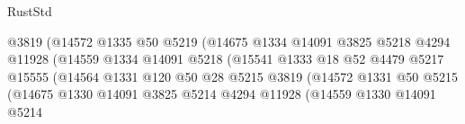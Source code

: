 \begin{lexlean}{RustStd}
\begin{coremodule}
                                            @3819
                                            (@14572
                                              @1335
                                              @50
                                              @5219
                                              (@14675
                                                @1334
                                                @14091
                                                @3825
                                                @5218
                                                @4294
                                                @11928
                                                (@14559
                                                  @1334
                                                  @14091
                                                  @5218
                                                  (@15541
                                                    @1333
                                                    @18
                                                    @52
                                                    @4479
                                                    @5217
                                                    @15555
                                                    (@14564
                                                      @1331
                                                      @120
                                                      @50
                                                      @28
                                                      @5215
                                                      @3819
                                                      (@14572
                                                        @1331
                                                        @50
                                                        @5215
                                                        (@14675
                                                          @1330
                                                          @14091
                                                          @3825
                                                          @5214
                                                          @4294
                                                          @11928
                                                          (@14559
                                                            @1330
                                                            @14091
                                                            @5214

\end{coremodule}
\end{lexlean}

